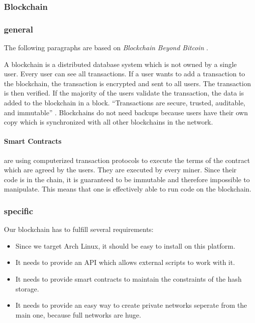 \subsubsection{Blockchain} \label{sec:blockchain}

\subsubsection*{general}
The following paragraphs are based on \emph{Blockchain Beyond Bitcoin} \cite{Underwood}.

A blockchain is a distributed database system which is not owned by a single user. Every user can see all transactions. If a user wants to add a transaction to the blockchain, the transaction is encrypted and sent to all users. The transaction is then verified. If the majority of the users validate the transaction, the data is added to the blockchain in a block. ``Transactions are secure, trusted, auditable, and immutable'' \cite{Underwood}. Blockchains do not need backups because users have their own copy which is synchronized with all other blockchains in the network.

\paragraph*{Smart Contracts} are using computerized transaction protocols to execute the terms of the contract which are agreed by the users. They are executed by every miner. Since their code is in the chain, it is guaranteed to be immutable and therefore impossible to manipulate. This means that one is effectively able to run code on the blockchain.

\subsubsection*{specific}
Our blockchain has to fulfill several requirements:
\begin{itemize}
	\item Since we target Arch Linux, it should be easy to install on this platform.
	\item It needs to provide an API which allows external scripts to work with it.
	\item It needs to provide smart contracts to maintain the constraints of the hash storage.
	\item It needs to provide an easy way to create private networks seperate from the main one, because full networks are huge.
\end{itemize}

